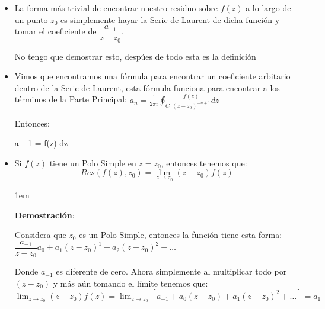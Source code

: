 \documentclass[12pt, fleqn]{report}                             %
\newenvironment{SmallIndentation}[1][0.75em]                    %
    {\begin{adjustwidth}{#1}{}\begin{footnotesize}}                 %
    {\end{footnotesize}\end{adjustwidth}}                           %
\newenvironment{MultiLineEquation*}[1]                          %
        {\begin{equation*}\begin{alignedat}{#1}}                    %
        {\end{alignedat}\end{equation*}}                            %
\begin{document}
                \begin{itemize}

                    \item
                        La forma más trivial de encontrar nuestro residuo sobre $f(z)$
                        a lo largo de un punto $z_0$ es simplemente hayar la Serie de Laurent
                        de dicha función y tomar el coeficiente de $\dfrac{a_{-1}}{z-z_0}$.

                        No tengo que demostrar esto, despúes de todo esta es la definición


                    \item
                        Vimos que encontramos una fórmula para encontrar un coeficiente arbitario
                        dentro de la Serie de Laurent, esta fórmula funciona para encontrar a
                        los términos de la Parte Principal:
                        $a_n = \frac{1}{2 \pi i} \oint_C \frac{f(z)}{(z - z_0)^{-n+1}} dz$

                        Entonces:
                        \begin{MultiLineEquation*}{3}
                            a_{-1} =  \oint f(z) dz
                        \end{MultiLineEquation*}
                            
                    
                    \item 
                        Si $f(z)$ tiene un Polo Simple en $z = z_0$, entonces
                        tenemos que:
                        \begin{equation*}
                            Res(f(z), z_0) = \lim_{z \to z_0} (z - z_0) f(z)
                        \end{equation*} 

                        \begin{SmallIndentation}[1em]
                            \textbf{Demostración}:
                            
                            Considera que $z_0$ es un Polo Simple, entonces la función
                            tiene esta forma:
                            $\dfrac{a_{-1}}{z-z_0} a_0 + a_1(z - z_0)^1 
                                        + a_2(z - z_0)^2 + \dots$

                            Donde $a_{-1}$ es diferente de cero. Ahora simplemente al
                            multiplicar todo por $(z-z_0)$ y más aún tomando el
                            límite tenemos que:
                            $\lim_{z \to z_0} (z - z_0) f(z)
                                    = \lim_{z \to z_0} [a_{-1} + a_0(z - z_0) 
                                        + a_1(z - z_0)^2 + \dots]           
                                    = a_1$
                                

\end{SmallIndentation}
\end{itemize}
\end{document}
